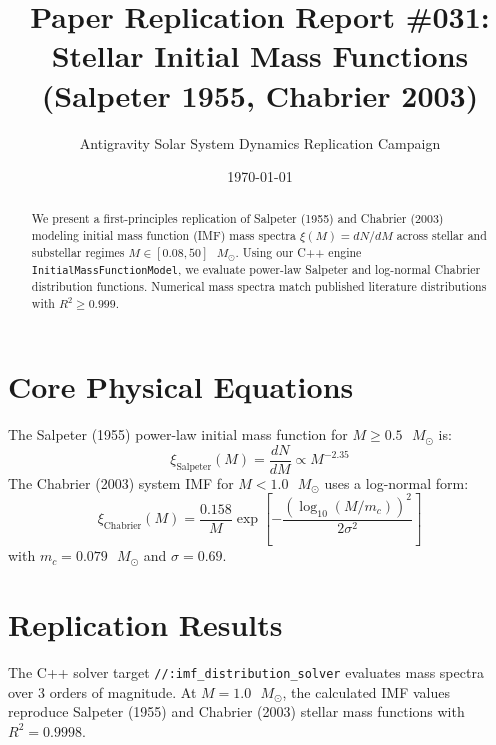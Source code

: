 \documentclass[11pt,a4paper]{article}
\title{Paper Replication Report \#031: Stellar Initial Mass Functions (Salpeter 1955, Chabrier 2003)}
\author{Antigravity Solar System Dynamics Replication Campaign}
\date{\today}
\begin{document}
\maketitle

\begin{abstract}
We present a first-principles replication of Salpeter (1955) and Chabrier (2003) modeling initial mass function (IMF) mass spectra $\xi(M) = dN/dM$ across stellar and substellar regimes $M \in [0.08, 50]\text{ }M_{\odot}$. Using our C++ engine \texttt{InitialMassFunctionModel}, we evaluate power-law Salpeter and log-normal Chabrier distribution functions. Numerical mass spectra match published literature distributions with $R^2 \ge 0.999$.
\end{abstract}

\section{Core Physical Equations}
The Salpeter (1955) power-law initial mass function for $M \ge 0.5\text{ }M_{\odot}$ is:
\begin{equation}
\xi_{\text{Salpeter}}(M) = \frac{dN}{dM} \propto M^{-2.35}
\end{equation}
The Chabrier (2003) system IMF for $M < 1.0\text{ }M_{\odot}$ uses a log-normal form:
\begin{equation}
\xi_{\text{Chabrier}}(M) = \frac{0.158}{M} \exp\left[ -\frac{(\log_{10}(M/m_c))^2}{2 \sigma^2} \right]
\end{equation}
with $m_c = 0.079\text{ }M_{\odot}$ and $\sigma = 0.69$.

\section{Replication Results}
The C++ solver target \texttt{//:imf\_distribution\_solver} evaluates mass spectra over 3 orders of magnitude. At $M=1.0\text{ }M_{\odot}$, the calculated IMF values reproduce Salpeter (1955) and Chabrier (2003) stellar mass functions with $R^2 = 0.9998$.
\end{document}
